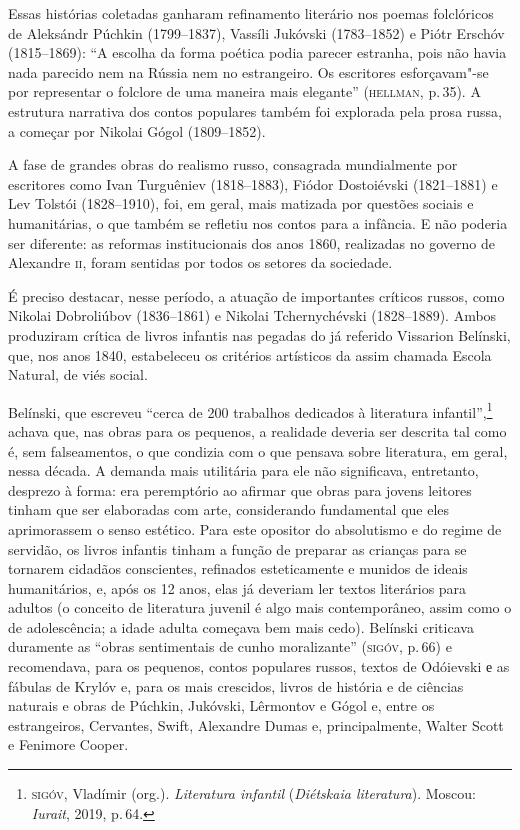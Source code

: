 Essas histórias coletadas ganharam refinamento literário nos poemas
folclóricos de Aleksándr Púchkin (1799--1837), Vassíli Jukóvski
(1783--1852) e Piótr Erschóv (1815--1869): ``A escolha da forma
poética podia parecer estranha, pois não havia nada parecido nem na
Rússia nem no estrangeiro. Os escritores esforçavam"-se por representar o
folclore de uma maneira mais elegante'' (\textsc{hellman}, p.\,35). A estrutura
narrativa dos contos populares também foi explorada pela prosa russa, a
começar por Nikolai Gógol (1809--1852).

A fase de grandes obras do realismo russo, consagrada mundialmente por
escritores como Ivan Turguêniev (1818--1883), Fiódor Dostoiévski
(1821--1881) e Lev Tolstói (1828--1910), foi, em geral, mais matizada
por questões sociais e humanitárias, o que também se refletiu nos contos
para a infância. E não poderia ser diferente: as reformas institucionais
dos anos 1860, realizadas no governo de Alexandre \textsc{ii}, foram sentidas por
todos os setores da sociedade.

É preciso destacar, nesse período, a atuação de importantes críticos
russos, como Nikolai Dobroliúbov (1836--1861) e Nikolai Tchernychévski
(1828--1889). Ambos produziram crítica de livros infantis nas pegadas do
já referido Vissarion Belínski, que, nos anos 1840, estabeleceu os
critérios artísticos da assim chamada Escola Natural, de viés social.

Belínski, que escreveu ``cerca de 200 trabalhos dedicados à literatura
infantil'',\footnote{\textsc{sigóv}, Vladímir (org.). \emph{Literatura infantil}
  (\emph{Diétskaia literatura}). Moscou: \emph{Iurait}, 2019, p.\,64.} achava
que, nas obras para os pequenos, a realidade deveria ser descrita tal
como é, sem falseamentos, o que condizia com o que pensava sobre
literatura, em geral, nessa década. A demanda mais utilitária para ele
não significava, entretanto, desprezo à forma: era peremptório ao
afirmar que obras para jovens leitores tinham que ser elaboradas com
arte, considerando fundamental que eles aprimorassem o senso estético.
Para este opositor do absolutismo e do regime de servidão, os livros
infantis tinham a função de preparar as crianças para se tornarem
cidadãos conscientes, refinados esteticamente e munidos de ideais
humanitários, e, após os 12 anos, elas já deveriam ler textos literários
para adultos (o conceito de literatura juvenil é algo mais contemporâneo,
assim como o de adolescência; a idade adulta começava bem mais cedo).
Belínski criticava duramente as ``obras sentimentais de cunho
moralizante'' (\textsc{sigóv}, p.\,66) e recomendava, para os pequenos, contos
populares russos, textos de Odóievski е as fábulas de Krylóv e, para os
mais crescidos, livros de história e de ciências naturais e obras de
Púchkin, Jukóvski, Lêrmontov e Gógol e, entre os estrangeiros,
Cervantes, Swift, Alexandre Dumas e, principalmente, Walter Scott e
Fenimore Cooper.

